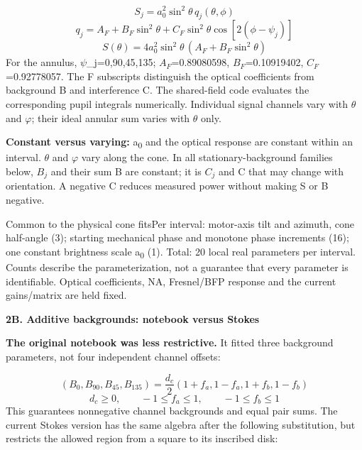 \documentclass[10pt,a4paper]{article}
\newcommand{\heading}[1]{{\sffamily\Large\bfseries\color{ink}#1}\par\vspace{7pt}}
\begin{document}
\begin{equation*}S_j=a_0^2\sin^2\theta\,q_j(\theta,\phi)\end{equation*}
\begin{equation*}q_j=A_F+B_F\sin^2\theta+C_F\sin^2\theta\cos[2(\phi-\psi_j)]\end{equation*}
\begin{equation*}S(\theta)=4a_0^2\sin^2\theta\,(A_F+B_F\sin^2\theta)\end{equation*}
For the annulus, \(ψ\)\_j=0\textdegree{},90\textdegree{},45\textdegree{},135\textdegree{}; \(A_{F}\)=0.89080598, \(B_{F}\)=0.10919402, \(C_{F}\)=0.92778057. The F subscripts distinguish the optical coefficients from background B and interference C. The shared-field code evaluates the corresponding pupil integrals numerically. Individual signal channels vary with \(θ\) and \(φ\); their ideal annular sum varies with \(θ\) only.\par
\textbf{Constant versus varying:} a\textsubscript{0} and the optical response are constant within an interval. \(θ\) and \(φ\) vary along the cone. In all stationary-background families below, \(B_{j}\) and their sum B are constant; it is \(C_{j}\) and C that may change with orientation. A negative C reduces measured power without making S or B negative.\par
\begin{fitbox}{Common to the physical cone fits}Per interval: motor-axis tilt and azimuth, cone half-angle (3); starting mechanical phase and monotone phase increments (16); one constant brightness scale a\textsubscript{0} (1). Total: 20 local real parameters per interval. Counts describe the parameterization, not a guarantee that every parameter is identifiable. Optical coefficients, NA, Fresnel/BFP response and the current gains/matrix are held fixed.\end{fitbox}
\clearpage
\heading{2B. Additive backgrounds: notebook versus Stokes}
\textbf{The original notebook was less restrictive.} It fitted three background parameters, not four independent channel offsets:\par
\begin{equation*}(B_0,B_{90},B_{45},B_{135})=\frac{d_c}{2}(1+f_a,1-f_a,1+f_b,1-f_b)\end{equation*}
\begin{equation*}d_c\geq0,\qquad -1\leq f_a\leq1,\qquad -1\leq f_b\leq1\end{equation*}
This guarantees nonnegative channel backgrounds and equal pair sums. The current Stokes version has the same algebra after the following substitution, but restricts the allowed region from a square to its inscribed disk:\par
\end{document}
